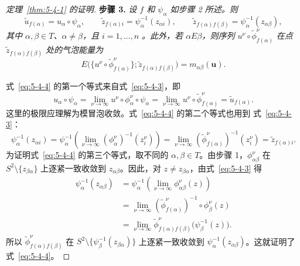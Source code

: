\begin{proof}[定理~\ref{thm:5-4-1} 的证明]
\medskip
\noindent\textbf{步骤 3.}\quad
\emph{设 $f$ 和 $\psi_\alpha$ 如步骤 2 所述。则}
\begin{equation}\label{eq:5-4-4}
  \widetilde u_{f(\alpha)}=u_\alpha\circ\psi_\alpha,
  \qquad
  \widetilde z_{f(\alpha)i}=\psi_\alpha^{-1}(z_{\alpha i}),
  \qquad
  \widetilde z_{f(\alpha)f(\beta)}=\psi_\alpha^{-1}(z_{\alpha\beta}),
\end{equation}
\emph{其中 $\alpha,\beta\in T$、$\alpha\ne\beta$，且 $i=1,\ldots,n$
。此外，若 $\alpha E\beta$，则序列
$u^\nu\circ\widetilde\phi_{f(\alpha)}^\nu$ 在点
$\widetilde z_{f(\alpha)f(\beta)}$ 处的气泡能量为}
\begin{equation}\label{eq:5-4-5}
  E\bigl(\{u^\nu\circ\widetilde\phi_{f(\alpha)}^\nu\};
    \widetilde z_{f(\alpha)f(\beta)}\bigr)
  =m_{\alpha\beta}(\mathbf u).
\end{equation}

式~\eqref{eq:5-4-4} 的第一个等式来自式~\eqref{eq:5-4-3}，即
\[
  u_\alpha\circ\psi_\alpha
  =\lim_{\nu\to\infty}u^\nu\circ\phi_\alpha^\nu\circ\psi_\alpha
  =\lim_{\nu\to\infty}u^\nu\circ\widetilde\phi_{f(\alpha)}^\nu
  =\widetilde u_{f(\alpha)}.
\]
这里的极限应理解为模冒泡收敛。式~\eqref{eq:5-4-4} 的第二个等式也用到
式~\eqref{eq:5-4-3}：
\[
  \psi_\alpha^{-1}(z_{\alpha i})
  =\psi_\alpha^{-1}\left(
    \lim_{\nu\to\infty}(\phi_\alpha^\nu)^{-1}(z_i^\nu)\right)
  =\lim_{\nu\to\infty}(\widetilde\phi_{f(\alpha)}^\nu)^{-1}(z_i^\nu)
  =\widetilde z_{f(\alpha)i}.
\]
为证明式~\eqref{eq:5-4-4} 的第三个等式，取不同的
$\alpha,\beta\in T$。由步骤 1，$\phi_{\alpha\beta}^\nu$ 在
$S^2\setminus\{z_{\beta\alpha}\}$ 上逐紧一致收敛到 $z_{\alpha\beta}$。因此，对
$z\ne z_{\beta\alpha}$，由式~\eqref{eq:5-4-3} 得
\[
  \begin{aligned}
  \psi_\alpha^{-1}(z_{\alpha\beta})
  &=\psi_\alpha^{-1}\left(
    \lim_{\nu\to\infty}\phi_{\alpha\beta}^\nu(z)\right)\\
  &=\lim_{\nu\to\infty}
    (\widetilde\phi_{f(\alpha)}^\nu)^{-1}\circ\phi_\beta^\nu(z)\\
  &=\lim_{\nu\to\infty}
    \widetilde\phi_{f(\alpha)f(\beta)}^\nu
    \bigl(\psi_\beta^{-1}(z)\bigr).
  \end{aligned}
\]
所以 $\widetilde\phi_{f(\alpha)f(\beta)}^\nu$ 在
$S^2\setminus\{\psi_\beta^{-1}(z_{\beta\alpha})\}$ 上逐紧一致收敛到
$\psi_\alpha^{-1}(z_{\alpha\beta})$。这就证明了式~\eqref{eq:5-4-4}。


\end{proof}
